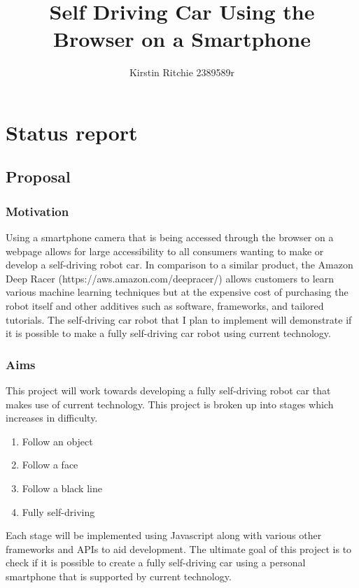 \documentclass[11pt]{article}
\title{Self Driving Car Using the Browser on a Smartphone}
\author{Kirstin Ritchie 2389589r}
\begin{document}
    \maketitle
    
    
     

\section{Status report}

\subsection{Proposal}\label{proposal}

\subsubsection{Motivation}\label{motivation}

Using a smartphone camera that is being accessed through the browser on a webpage 
allows for large accessibility to all consumers wanting to make or develop a 
self-driving robot car. In comparison to a similar product, the Amazon Deep Racer 
(https://aws.amazon.com/deepracer/) allows customers to learn various machine 
learning techniques but at the expensive cost of purchasing the robot itself 
and other additives such as software, frameworks, and tailored tutorials. The 
self-driving car robot that I plan to implement will demonstrate if it is 
possible to make a fully self-driving car robot using current technology.

\subsubsection{Aims}\label{aims}

This project will work towards developing a fully self-driving robot car 
that makes use of current technology. This project is broken up into stages 
which increases in difficulty.

\begin{enumerate}
\item Follow an object 
\item Follow a face 
\item Follow a black line 
\item Fully self-driving 
\end{enumerate}

Each stage will be implemented using Javascript along with various other frameworks 
and APIs to aid development. The ultimate goal of this project is to check if it is 
possible to create a fully self-driving car using a personal smartphone that 
is supported by current technology. 
\end{document}
